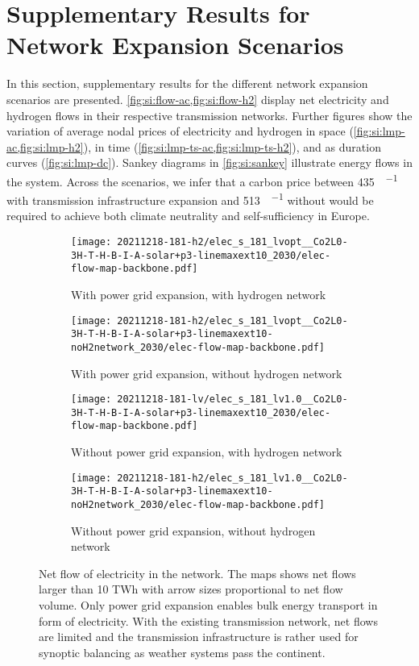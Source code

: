 \section{Supplementary Results for Network Expansion Scenarios}
\label{sec:si:results-network-expansion}

In this section, supplementary results for the different network expansion
scenarios are presented. \cref{fig:si:flow-ac,fig:si:flow-h2} display net
electricity and hydrogen flows in their respective transmission networks.
Further figures show the variation of average nodal prices of electricity and
hydrogen in space (\cref{fig:si:lmp-ac,fig:si:lmp-h2}), in time
(\cref{fig:si:lmp-ts-ac,fig:si:lmp-ts-h2}), and as duration curves
(\cref{fig:si:lmp-dc}). Sankey diagrams in \cref{fig:si:sankey} illustrate
energy flows in the system. Across the scenarios, we infer that a carbon price
between \SI{435}{\sieuro\per\tco} with transmission infrastructure expansion and
\SI{513}{\sieuro\per\tco} without would be required to achieve both climate
neutrality and self-sufficiency in Europe.

\begin{figure}
    \begin{subfigure}{0.49\textwidth}
        \centering
        \caption{With power grid expansion, with hydrogen network}
        \texttt{[image: 20211218-181-h2/elec\_s\_181\_lvopt\_\_Co2L0-3H-T-H-B-I-A-solar+p3-linemaxext10\_2030/elec-flow-map-backbone.pdf]}
    \end{subfigure}
    \begin{subfigure}{0.49\textwidth}
        \centering
        \caption{With power grid expansion, without hydrogen network}
        \texttt{[image: 20211218-181-h2/elec\_s\_181\_lvopt\_\_Co2L0-3H-T-H-B-I-A-solar+p3-linemaxext10-noH2network\_2030/elec-flow-map-backbone.pdf]}
    \end{subfigure}
    \begin{subfigure}{0.49\textwidth}
        \centering
        \caption{Without power grid expansion, with hydrogen network}
        \texttt{[image: 20211218-181-lv/elec\_s\_181\_lv1.0\_\_Co2L0-3H-T-H-B-I-A-solar+p3-linemaxext10\_2030/elec-flow-map-backbone.pdf]}
    \end{subfigure}
    \begin{subfigure}{0.49\textwidth}
        \centering
        \caption{Without power grid expansion, without hydrogen network}
        \texttt{[image: 20211218-181-h2/elec\_s\_181\_lv1.0\_\_Co2L0-3H-T-H-B-I-A-solar+p3-linemaxext10-noH2network\_2030/elec-flow-map-backbone.pdf]}
    \end{subfigure}
    \caption{Net flow of electricity in the network. The maps shows net flows larger than 10 TWh with arrow sizes proportional to net flow volume. Only power grid expansion enables bulk energy transport in form of electricity. With the existing transmission network, net flows are limited and the transmission infrastructure is rather used for synoptic balancing as weather systems pass the continent.}
    \label{fig:si:flow-ac}
\end{figure}

